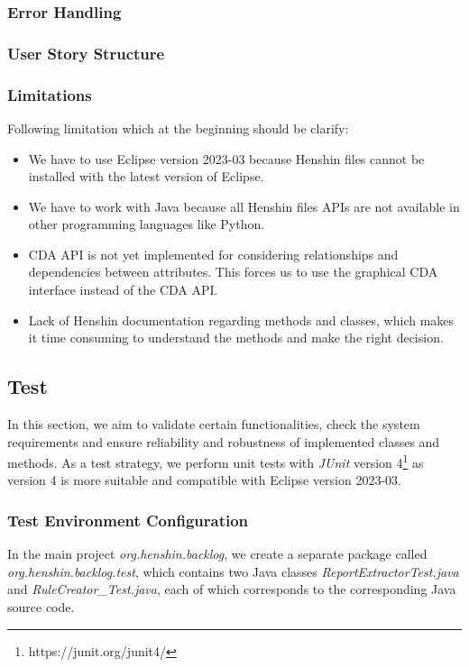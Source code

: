 \subsubsection*{Error Handling}

\subsubsection*{User Story Structure}

\subsubsection*{Limitations}
Following limitation which at the beginning should be clarify:
\begin{itemize}
	\item We have to use Eclipse version 2023-03 because Henshin files cannot be installed with the latest version of Eclipse.
	\item We have to work with Java because all Henshin files APIs are not available in other programming languages like Python.
	\item CDA API is not yet implemented for considering relationships and dependencies between attributes. This forces us to use the graphical CDA interface instead of the CDA API.
	\item Lack of Henshin documentation regarding methods and classes, which makes it time consuming to understand the methods and make the right decision.
\end{itemize}


\subsection{Test}\label{redundancy_test}
In this section, we aim to validate certain functionalities, check the system requirements and ensure reliability and robustness of implemented classes and methods. As a test strategy, we perform unit tests with \textit{JUnit} version 4\footnote{https://junit.org/junit4/} as version 4 is more suitable and compatible with Eclipse version 2023-03.

\subsubsection*{Test Environment Configuration}
In the main project \textit{org.henshin.backlog}, we create a separate package called \textit{org.henshin.backlog.test}, which contains two Java classes \textit{ReportExtractorTest.java} and \textit{RuleCreator\_Test.java}, each of which corresponds to the corresponding Java source code.

